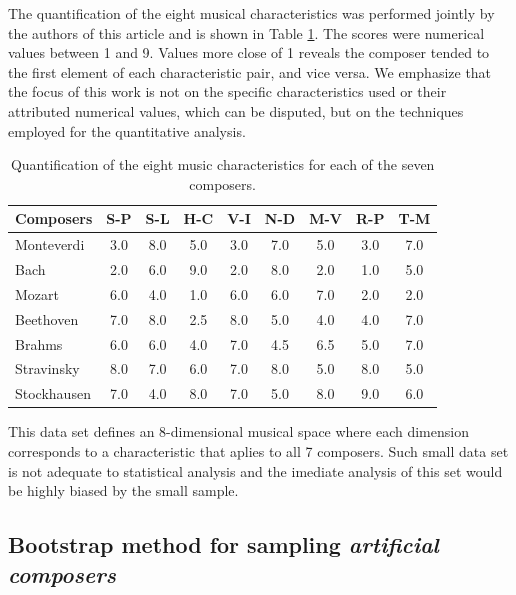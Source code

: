 \documentclass[
 aip,
 jmp,
 amsmath,amssymb,
 reprint,
]{revtex4-1}
\begin{document}
The quantification of the eight musical
characteristics was performed jointly by the authors of this
article and is shown in Table \ref{tab:tableA}. The scores were
numerical values between 1 and 9. Values more close of 1 reveals the
composer tended to the first element of each characteristic pair, and
vice versa. We emphasize that the focus of this work is not on the specific 
characteristics used or their attributed numerical values,
which can be disputed, but on the techniques employed for the quantitative analysis.

\begin{table}[ht]
\caption{\label{tab:tableA}Quantification of the
eight music characteristics for each of the seven composers.}

\begin{ruledtabular}
\begin{tabular}{|l||c|c|c|c|c|c|c|c|}

 Composers    & S-P & S-L & H-C & V-I & N-D & M-V & R-P & T-M  \\
\hline
 Monteverdi   & 3.0 & 8.0 & 5.0 & 3.0 & 7.0 & 5.0 & 3.0 & 7.0  \\
 Bach         & 2.0 & 6.0 & 9.0 & 2.0 & 8.0 & 2.0 & 1.0 & 5.0  \\
 Mozart       & 6.0 & 4.0 & 1.0 & 6.0 & 6.0 & 7.0 & 2.0 & 2.0  \\
 Beethoven    & 7.0 & 8.0 & 2.5 & 8.0 & 5.0 & 4.0 & 4.0 & 7.0  \\
 Brahms       & 6.0 & 6.0 & 4.0 & 7.0 & 4.5 & 6.5 & 5.0 & 7.0  \\
 Stravinsky   & 8.0 & 7.0 & 6.0 & 7.0 & 8.0 & 5.0 & 8.0 & 5.0  \\
 Stockhausen  & 7.0 & 4.0 & 8.0 & 7.0 & 5.0 & 8.0 & 9.0 & 6.0  \\

\end{tabular}
\end{ruledtabular}
\end{table}

This data set defines an 8-dimensional musical space where each dimension
corresponds to a characteristic that aplies to all 7 composers. 
Such small data set is not adequate to statistical analysis and the imediate analysis of this set would
be highly biased by the small sample.

\subsection{Bootstrap method for sampling \emph{artificial composers}}
\end{document}
